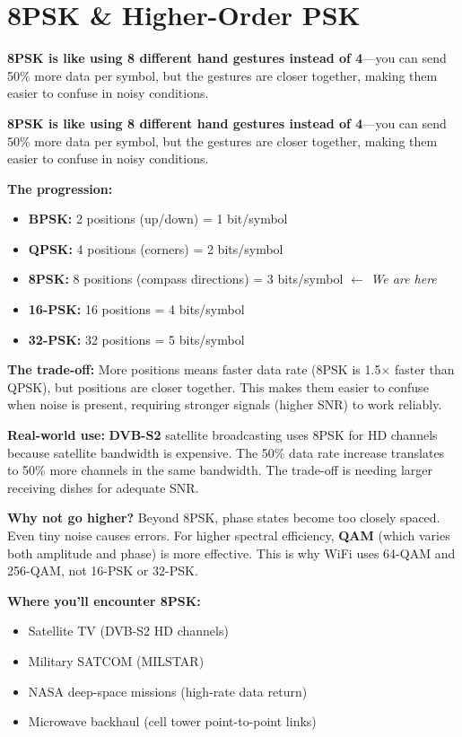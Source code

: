 \chapter{8PSK \& Higher-Order PSK}
\label{ch:8psk}

\begin{nontechnical}
\textbf{8PSK is like using 8 different hand gestures instead of 4}---you can send 50\% more data per symbol, but the gestures are closer together, making them easier to confuse in noisy conditions.

\textbf{8PSK is like using 8 different hand gestures instead of 4}---you can send 50\% more data per symbol, but the gestures are closer together, making them easier to confuse in noisy conditions.

\textbf{The progression:}
\begin{itemize}
\item \textbf{BPSK:} 2 positions (up/down) = 1 bit/symbol
\item \textbf{QPSK:} 4 positions (corners) = 2 bits/symbol
\item \textbf{8PSK:} 8 positions (compass directions) = 3 bits/symbol $\leftarrow$ \emph{We are here}
\item \textbf{16-PSK:} 16 positions = 4 bits/symbol
\item \textbf{32-PSK:} 32 positions = 5 bits/symbol
\end{itemize}

\textbf{The trade-off:} More positions means faster data rate (8PSK is 1.5$\times$ faster than QPSK), but positions are closer together. This makes them easier to confuse when noise is present, requiring stronger signals (higher SNR) to work reliably.

\textbf{Real-world use:} \textbf{DVB-S2} satellite broadcasting uses 8PSK for HD channels because satellite bandwidth is expensive. The 50\% data rate increase translates to 50\% more channels in the same bandwidth. The trade-off is needing larger receiving dishes for adequate SNR.

\textbf{Why not go higher?} Beyond 8PSK, phase states become too closely spaced. Even tiny noise causes errors. For higher spectral efficiency, \textbf{QAM} (which varies both amplitude and phase) is more effective. This is why WiFi uses 64-QAM and 256-QAM, not 16-PSK or 32-PSK.

\textbf{Where you'll encounter 8PSK:}
\begin{itemize}
\item Satellite TV (DVB-S2 HD channels)
\item Military SATCOM (MILSTAR)
\item NASA deep-space missions (high-rate data return)
\item Microwave backhaul (cell tower point-to-point links)
\end{itemize}


\end{nontechnical}
